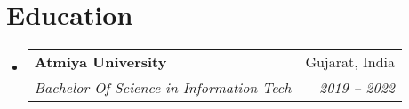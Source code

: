 \documentclass[letterpaper,12pt]{article}
\makeatletter
\newcommand{\resumeItem}[1]{
  \item\small{
    {#1 \vspace{-2pt}}
  }
}
\newcommand{\resumeItemListHeading}[1]{
  \small{
    {\vspace{10pt} \hspace{-16pt} \textbf{#1}: \vspace{-4pt}}
  }
}
\newcommand{\resumeSubheading}[4]{
  \vspace{-2pt}\item
    \begin{tabular*}{0.97\textwidth}[t]{l@{\extracolsep{\fill}}r}
      \textbf{#1} & #2 \\
      \textit{\small#3} & \textit{\small #4} \\
    \end{tabular*}\vspace{-7pt}
}
\newcommand{\resumeProjectHeading}[2]{
    \item
    \begin{tabular*}{0.97\textwidth}{l@{\extracolsep{\fill}}r}
      \small#1 & #2 \\
    \end{tabular*}\vspace{-7pt}
}
\newcommand{\resumeSubHeadingListStart}{\begin{itemize}[leftmargin=0.15in, label={}]}
\newcommand{\resumeSubHeadingListEnd}{\end{itemize}}
\newcommand{\resumeItemListStart}{\begin{itemize}}
\newcommand{\resumeItemListEnd}{\end{itemize}\vspace{-5pt}}
\makeatother
\begin{document}


\section{Education}
\resumeSubHeadingListStart
\resumeSubheading
{Atmiya University}{Gujarat, India}
{Bachelor Of Science in Information Tech}{2019 -- 2022} %
\resumeSubHeadingListEnd


%
\end{document}
